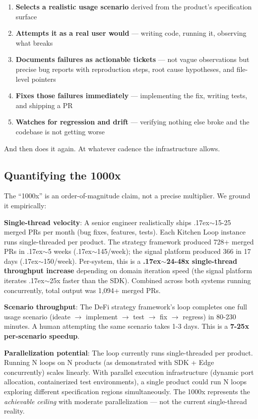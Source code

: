 \documentclass[11pt,a4paper]{article}
\newcommand{\roughly}{{\textraisebox{.17ex}{$\scriptstyle\sim$}}}
\newcommand{\textraisebox}[2]{\leavevmode\raise#1\hbox{#2}}
\providecommand{\tightlist}{%
  \setlength{\itemsep}{0pt}\setlength{\parskip}{0pt}}
\begin{document}
\begin{enumerate}
\def\labelenumi{\arabic{enumi}.}
\tightlist
\item
  \textbf{Selects a realistic usage scenario} derived from the product's specification surface
\item
  \textbf{Attempts it as a real user would} --- writing code, running it, observing what breaks
\item
  \textbf{Documents failures as actionable tickets} --- not vague observations but precise bug reports with reproduction steps, root cause hypotheses, and file-level pointers
\item
  \textbf{Fixes those failures immediately} --- implementing the fix, writing tests, and shipping a PR
\item
  \textbf{Watches for regression and drift} --- verifying nothing else broke and the codebase is not getting worse
\end{enumerate}

And then does it again. At whatever cadence the infrastructure allows.

\subsection{Quantifying the 1000x}\label{sec:quantifying-the-1000x}

The ``1000x'' is an order-of-magnitude claim, not a precise multiplier. We ground it empirically:

\textbf{Single-thread velocity}: A senior engineer realistically ships \roughly15-25 merged PRs per month (bug fixes, features, tests). Each Kitchen Loop instance runs single-threaded per product. The strategy framework produced 728+ merged PRs in \roughly5 weeks (\roughly145/week); the signal platform produced 366 in 17 days (\roughly150/week). Per-system, this is a \textbf{\roughly24-48x single-thread throughput increase} depending on domain iteration speed (the signal platform iterates \roughly25x faster than the SDK). Combined across both systems running concurrently, total output was 1,094+ merged PRs.

\textbf{Scenario throughput}: The DeFi strategy framework's loop completes one full usage scenario (ideate $\rightarrow$ implement $\rightarrow$ test $\rightarrow$ fix $\rightarrow$ regress) in 80-230 minutes. A human attempting the same scenario takes 1-3 days. This is a \textbf{7-25x per-scenario speedup}.

\textbf{Parallelization potential}: The loop currently runs single-threaded per product. Running N loops on N products (as demonstrated with SDK + Edge concurrently) scales linearly. With parallel execution infrastructure (dynamic port allocation, containerized test environments), a single product could run N loops exploring different specification regions simultaneously. The 1000x represents the \emph{achievable ceiling} with moderate parallelization --- not the current single-thread reality.
\end{document}
